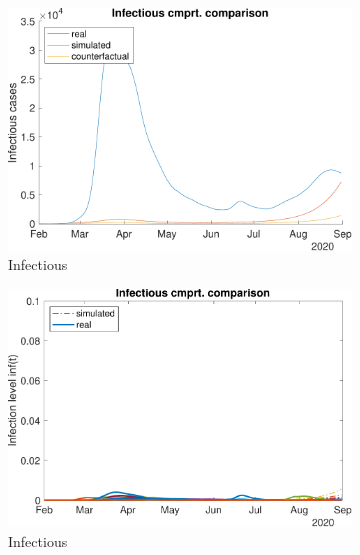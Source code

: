 \begin{figure}[hbtp]
\begin{subfigure}[b]{.45\linewidth}
         \centering
         \includegraphics[width=\linewidth]{img/210907_221615_combined_wave1/figures/COMP_inf}
         \caption{Infectious}
         \label{fig:compAggrCombWave1Inf}
     \end{subfigure}
     \hfill
     \begin{subfigure}[b]{.45\linewidth}
         \centering
         \includegraphics[width=\linewidth]{img/210907_221615_combined_wave1/figures/SEIR_i_sim-vs-real}
         \caption{Infectious}
         \label{fig:compCombWave1Inf}
     \end{subfigure}
     \newline
     \begin{subfigure}[b]{.45\linewidth}
         \centering

\end{subfigure}
\end{figure}
